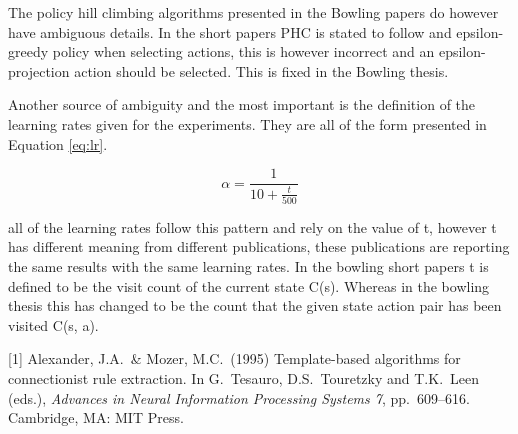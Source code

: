 \documentclass{article}
\begin{document}
The policy hill climbing algorithms presented in the Bowling papers do however have ambiguous details. In the short papers PHC is stated to follow and epsilon-greedy policy when selecting actions, this is however incorrect and an epsilon-projection action should be selected. This is fixed in the Bowling thesis.

Another source of ambiguity and the most important is the definition of the learning rates given for the experiments. They are all of the form presented in Equation \ref{eq:lr}. 

\begin{equation}
    \alpha = \frac{1}{10+\frac{t}{500}}\label{eq:lr}
\end{equation}

all of the learning rates follow this pattern and rely on the value of t, however t has different meaning from different publications, these publications are reporting the same results with the same learning rates. In the bowling short papers t is defined to be the visit count of the current state C(s). Whereas in the bowling thesis this has changed to be the count that the given state action pair has been visited C(s, a).



\medskip

\small

[1] Alexander, J.A.\ \& Mozer, M.C.\ (1995) Template-based algorithms for
connectionist rule extraction. In G.\ Tesauro, D.S.\ Touretzky and T.K.\ Leen
(eds.), {\it Advances in Neural Information Processing Systems 7},
pp.\ 609--616. Cambridge, MA: MIT Press.
\end{document}
